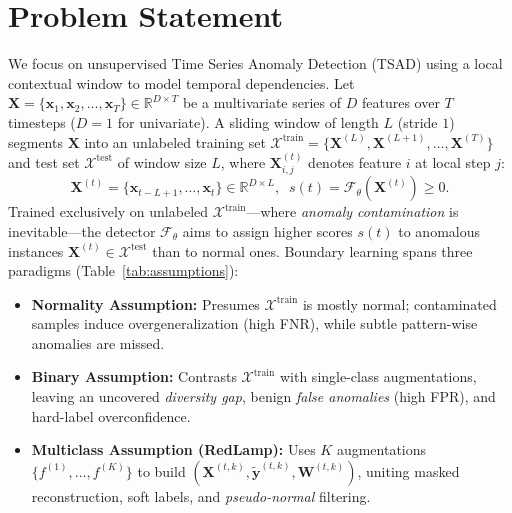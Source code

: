 \documentclass[sigconf,nonacm]{acmart}
\begin{document}
\section{Problem Statement}
We focus on unsupervised Time Series Anomaly Detection (TSAD) using a local contextual window to model temporal dependencies. Let $\mathbf{X} = \{\mathbf{x}_1, \mathbf{x}_2, \dots, \mathbf{x}_T\} \in \mathbb{R}^{D \times T}$ be a multivariate series of $D$ features over $T$ timesteps ($D=1$ for univariate). A sliding window of length $L$ (stride $1$) segments $\mathbf{X}$ into an unlabeled training set $\mathcal{X}^{\text{train}} = \{\mathbf{X}^{(L)}, \mathbf{X}^{(L+1)}, \dots, \mathbf{X}^{(T)}\}$ and test set $\mathcal{X}^{\text{test}}$ of window size $L$, where $\mathbf{X}^{(t)}_{i,j}$ denotes feature $i$ at local step $j$:
\begin{equation}
    \mathbf{X}^{(t)} = \{\mathbf{x}_{t-L+1}, \dots, \mathbf{x}_t\} \in \mathbb{R}^{D \times L}, \;\; s(t) = \mathcal{F}_{\theta}(\mathbf{X}^{(t)}) \ge 0.
\end{equation}
Trained exclusively on unlabeled $\mathcal{X}^{\text{train}}$---where \textit{anomaly contamination} is inevitable---the detector $\mathcal{F}_{\theta}$ aims to assign higher scores $s(t)$ to anomalous instances $\mathbf{X}^{(t)} \in \mathcal{X}^{\text{test}}$ than to normal ones. Boundary learning spans three paradigms (Table~\ref{tab:assumptions}):
\begin{itemize}
    \item \textbf{Normality Assumption:} Presumes $\mathcal{X}^{\text{train}}$ is mostly normal; contaminated samples induce overgeneralization (high FNR), while subtle pattern-wise anomalies are missed.
    \item \textbf{Binary Assumption:} Contrasts $\mathcal{X}^{\text{train}}$ with single-class augmentations, leaving an uncovered \textit{diversity gap}, benign \textit{false anomalies} (high FPR), and hard-label overconfidence.
    \item \textbf{Multiclass Assumption (RedLamp):} Uses $K$ augmentations $\{f^{(1)}, \dots, f^{(K)}\}$ to build $(\mathbf{X}^{(t,k)}, \tilde{\mathbf{y}}^{(t,k)}, \mathbf{W}^{(t,k)})$, uniting masked reconstruction, soft labels, and \textit{pseudo-normal} filtering.
\end{itemize}
\par\vspace{4pt plus 8pt minus 3pt}\noindent
\end{document}
